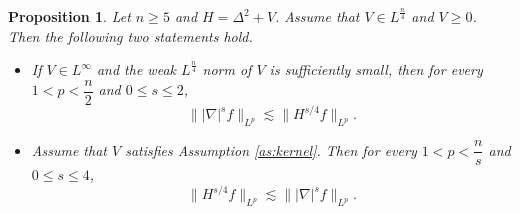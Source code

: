 \documentclass[11pt,a4paper]{article}
\numberwithin{equation}{section}
\newtheorem{proposition}[theorem]{Proposition}
\begin{document}
\begin{proposition}\label{prop:h equ}
Let $n \geq 5$ and $H = \Delta^{2} + V$. Assume that $V \in L^{\frac{n}{4}}$ and $V \geq 0$. Then the following two statements hold.
\begin{itemize}
\item If $V \in L^{\infty}$ and the weak $L^{\frac{n}{4}}$ norm of $V$ is sufficiently small, then for every $1 < p < \dfrac{n}{2}$ and $0 \leq s \leq 2$,
\begin{equation}\label{eq1}
  \||\nabla |^{s}f\|_{L^{p}} \lesssim \|H^{s/4}f\|_{L^{p}}.
\end{equation}
\item Assume that $V$ satisfies Assumption \ref{as:kernel}. Then for every $1 < p < \dfrac{n}{s}$ and $0 \leq s \leq 4$,
\begin{equation}\label{eq2}
  \|H^{s/4}f\|_{L^{p}} \lesssim \||\nabla |^{s}f\|_{L^{p}}.
\end{equation}
\end{itemize}
\end{proposition}
\end{document}

